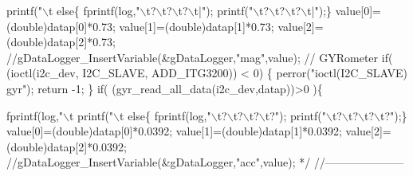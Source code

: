 \begin{DoxyCode}
{{{{       printf("\(\backslash\)t%
\textcolor{comment}{      else\{}
\textcolor{comment}{        fprintf(log,"\(\backslash\)t?\(\backslash\)t?\(\backslash\)t?\(\backslash\)t|"); printf("\(\backslash\)t?\(\backslash\)t?\(\backslash\)t?\(\backslash\)t|");\}}
\textcolor{comment}{      value[0]=(double)datap[0]*0.73;}
\textcolor{comment}{      value[1]=(double)datap[1]*0.73;}
\textcolor{comment}{      value[2]=(double)datap[2]*0.73;}
\textcolor{comment}{      //gDataLogger\_InsertVariable(&gDataLogger,"mag",value);}
\textcolor{comment}{  // GYRometer    }
\textcolor{comment}{      if( (ioctl(i2c\_dev, I2C\_SLAVE, ADD\_ITG3200)) < 0) \{}
\textcolor{comment}{        perror("ioctl(I2C\_SLAVE) gyr");}
\textcolor{comment}{        return -1;}
\textcolor{comment}{      \} }
\textcolor{comment}{      if( (gyr\_read\_all\_data(i2c\_dev,datap))>0 )\{}
\textcolor{comment}{        fprintf(log,"\(\backslash\)t%
       printf("\(\backslash\)t%
\textcolor{comment}{      else\{}
\textcolor{comment}{        fprintf(log,"\(\backslash\)t?\(\backslash\)t?\(\backslash\)t?\(\backslash\)t?"); printf("\(\backslash\)t?\(\backslash\)t?\(\backslash\)t?\(\backslash\)t?");\}}
\textcolor{comment}{      value[0]=(double)datap[0]*0.0392;}
\textcolor{comment}{      value[1]=(double)datap[1]*0.0392;}
\textcolor{comment}{      value[2]=(double)datap[2]*0.0392;}
\textcolor{comment}{      //gDataLogger\_InsertVariable(&gDataLogger,"acc",value);}
\textcolor{comment}{*/}  \textcolor{comment}{//---------------------}

}}}}}
\end{DoxyCode}
